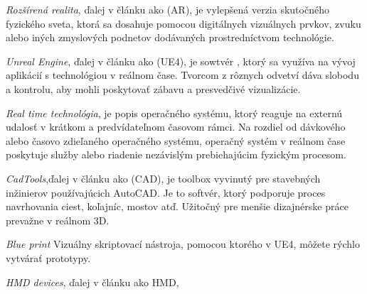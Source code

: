 \documentclass[10pt,twoside,slovak,a4paper]{article}
\begin{document}
\emph{Rozšírená realita}, ďalej v článku ako (AR), je vylepšená verzia skutočného fyzického sveta, ktorá sa dosahuje pomocou digitálnych vizuálnych prvkov, zvuku alebo iných zmyslových podnetov dodávaných prostredníctvom technológie.\vspace{5mm}\cite{joebardie_2020}

\emph{Unreal Engine}, ďalej v článku ako (UE4), je sowtvér , ktorý sa využíva na  vývoj aplikácií s technológiou v reálnom čase. Tvorcom z rôznych odvetví dáva slobodu a kontrolu, aby mohli poskytovať zábavu a presvedčivé vizualizácie.\vspace{5mm}

\emph{Real time technológia}, je popis operačného systému, ktorý reaguje na externú udalosť v krátkom a predvídateľnom časovom rámci. Na rozdiel od dávkového alebo časovo zdieľaného operačného systému, operačný systém v reálnom čase poskytuje služby alebo riadenie nezávislým prebiehajúcim fyzickým procesom.\vspace{5mm}

\emph{CadTools},ďalej v článku ako (CAD), je toolbox vyvinutý pre stavebných inžinierov používajúcich AutoCAD. Je to softvér, ktorý podporuje proces navrhovania ciest, koľajníc, mostov atď. Užitočný pre menšie dizajnérske práce prevažne v reálnom 3D.\vspace{5mm}

\emph{Blue print} Vizuálny skriptovací nástroja, pomocou ktorého v UE4, môžete rýchlo vytvárať prototypy.

\emph{HMD devices}, ďalej v článku ako {HMD}, %
\end{document}
